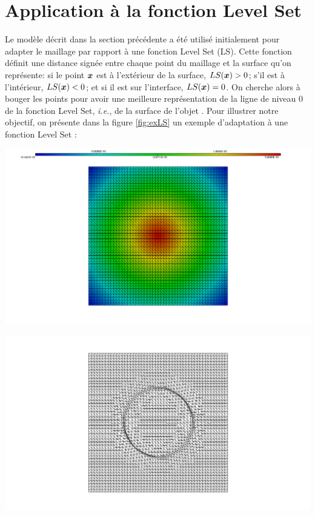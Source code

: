 \section{Application à la fonction Level Set}


\label{sec:application}

\indent Le modèle décrit dans la section précédente a été utilisé initialement pour adapter le maillage par rapport à une fonction Level Set (LS). Cette fonction définit une distance signée entre chaque point du maillage et la surface qu'on représente: si le point \(\boldsymbol{x}\) est à l'extérieur de la surface, \(LS(\boldsymbol{x}) > 0\); s'il est à l'intérieur, \(LS(\boldsymbol{x}) < 0\); et si il est sur l'interface, \(LS(\boldsymbol{x}) = 0\).  On cherche alors à bouger les points pour avoir une meilleure représentation de la ligne de niveau 0 de la fonction Level Set, \emph{i.e.}, de la surface de l'objet \cite{ducrot}. Pour illustrer notre objectif, on présente dans la figure \ref{fig:exLS} un exemple d'adaptation à une fonction Level Set :

\indent

\begingroup
	\begin{minipage}[t]{.5\linewidth}
		\centering
		\includegraphics[clip=true, trim = 10cm 0 10cm 0, scale=.25]{Bordeaux/figures/LSinit.png}
	\end{minipage}
	\hfill
	\begin{minipage}[t]{.5\linewidth}
		\centering
		\includegraphics[clip=true, trim = 10cm 0 10cm 0, scale=.25]{Bordeaux/figures/LSadapt.png}
	\end{minipage}
\endgroup

